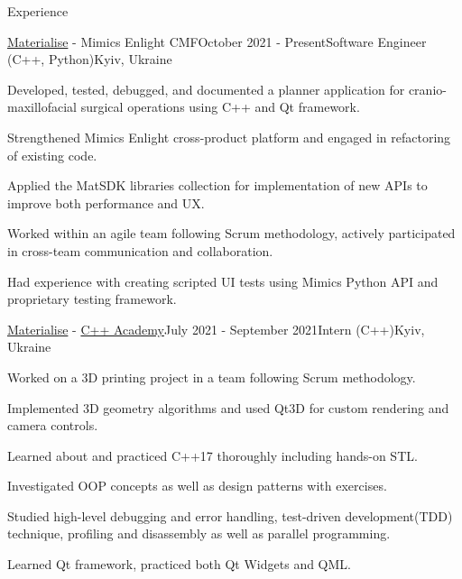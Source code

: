 \documentclass[
	11pt, %
]{resume} %
\begin{document}

\begin{rSection}{Experience}

	\begin{rSubsection}{\href{https://www.materialise.com/en}{\color{blue}Materialise} - Mimics Enlight CMF}{October 2021 - Present}{Software Engineer (C++, Python)}{Kyiv, Ukraine}
        \item Developed, tested, debugged, and documented a planner application for cranio-maxillofacial surgical operations using C++ and Qt framework.
        \item Strengthened Mimics Enlight cross-product platform and engaged in refactoring of existing code.
		\item Applied the MatSDK libraries collection for implementation of new APIs to improve both performance and UX.
        \item Worked within an agile team following Scrum methodology, actively participated in cross-team communication and collaboration.
        \item Had experience with creating scripted UI tests using Mimics Python API and proprietary testing framework.
	\end{rSubsection}


    \begin{rSubsection}{\href{https://www.materialise.com/en}{\color{blue}Materialise} - \href{https://www.materialise.com/en/careers/students-graduates/internships}{\color{blue}C++ Academy}}{July 2021 - September 2021}{Intern (C++)}{Kyiv, Ukraine}
        \item Worked on a 3D printing project in a team following Scrum methodology.
        \item Implemented 3D geometry algorithms and used Qt3D for custom rendering and camera controls.
        \item Learned about and practiced C++17 thoroughly including hands-on STL.
        \item Investigated OOP concepts as well as design patterns with exercises.
        \item Studied high-level debugging and error handling, test-driven development(TDD) technique, profiling and disassembly as well as parallel programming.
        \item Learned Qt framework, practiced both Qt Widgets and QML.
    \end{rSubsection}

\end{rSection}
\end{document}
